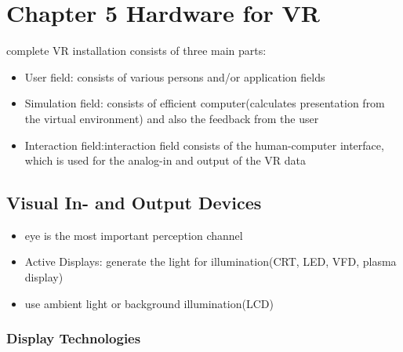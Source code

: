 \documentclass{standalone}
\begin{document}
\section{Chapter 5 Hardware for VR}
complete VR installation consists of three main parts:
\begin{itemize}
\item User field: consists of various persons and/or application fields
\item Simulation field: consists of efficient computer(calculates presentation from the virtual environment) and also the feedback from the user
\item Interaction field:interaction field consists of the human-computer interface, which is used for the analog-in and output of the VR data 
\end{itemize}
\subsection{Visual In- and Output Devices}
\begin{itemize}
\item eye is the most important perception channel
\item Active Displays: generate the light for illumination(CRT, LED, VFD, plasma display)
\item use ambient light or background illumination(LCD)
\end{itemize}
\subsubsection{Display Technologies}
\end{document}
